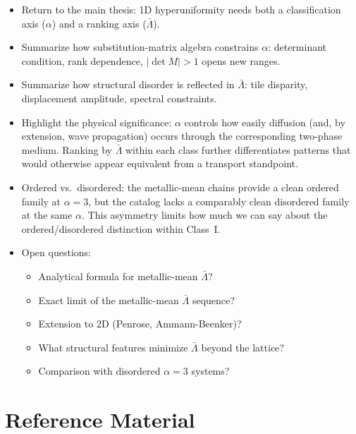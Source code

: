 \documentclass[11pt]{article}
\newcommand{\Lb}{\bar\Lambda}
\begin{document}
\begin{itemize}[leftmargin=1.5em]
  \item Return to the main thesis: 1D hyperuniformity needs both a
        classification axis ($\alpha$) and a ranking axis ($\Lb$).

  \item Summarize how substitution-matrix algebra constrains $\alpha$:
        determinant condition, rank dependence, $|\det M| > 1$ opens
        new ranges.

  \item Summarize how structural disorder is reflected in $\Lb$:
        tile disparity, displacement amplitude, spectral constraints.

  \item Highlight the physical significance: $\alpha$ controls how
        easily diffusion (and, by extension, wave propagation) occurs
        through the corresponding two-phase medium. Ranking by $\Lb$
        within each class further differentiates patterns that would
        otherwise appear equivalent from a transport standpoint.

  \item Ordered vs.\ disordered: the metallic-mean chains provide a
        clean ordered family at $\alpha = 3$, but the catalog lacks a
        comparably clean disordered family at the same $\alpha$.
        This asymmetry limits how much we can say about the
        ordered/disordered distinction within Class~I.

  \item Open questions:
        \begin{itemize}[noitemsep]
          \item Analytical formula for metallic-mean $\Lb$?
          \item Exact limit of the metallic-mean $\Lb$ sequence?
          \item Extension to 2D (Penrose, Ammann-Beenker)?
          \item What structural features minimize $\Lb$ beyond the lattice?
          \item Comparison with disordered $\alpha = 3$ systems?
        \end{itemize}
\end{itemize}

\section{Reference Material}
\end{document}
